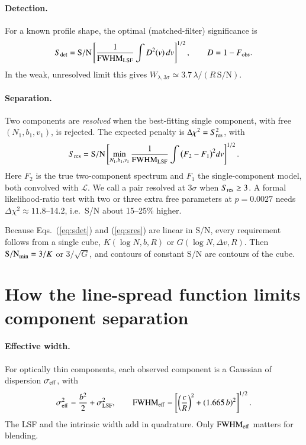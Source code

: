 \documentclass[10pt]{article}
\newcommand{\SN}{\ensuremath{\mathrm{S/N}}}
\newcommand{\fwhm}{\ensuremath{\mathrm{FWHM}}}
\newcommand{\Sdet}{\ensuremath{S_{\rm det}}}
\newcommand{\Sres}{\ensuremath{S_{\rm res}}}
\begin{document}
\paragraph{Detection.} For a known profile shape, the optimal (matched-filter) significance is
\begin{equation}
\Sdet=\SN\left[\frac{1}{\fwhm_{\rm LSF}}\int D^2(v)\,dv\right]^{1/2},\qquad D=1-F_{\rm obs}.
\label{eq:sdet}
\end{equation}
In the weak, unresolved limit this gives $W_{\lambda,3\sigma}\simeq3.7\,\lambda/(R\,\SN)$.

\paragraph{Separation.} Two components are \emph{resolved} when the best-fitting single component, with free $(N_1,b_1,v_1)$, is rejected. The expected penalty is $\Delta\chi^2=\Sres^2$, with
\begin{equation}
\Sres=\SN\left[\min_{N_1,b_1,v_1}\frac{1}{\fwhm_{\rm LSF}}\int\big(F_{2}-F_{1}\big)^2dv\right]^{1/2}.
\label{eq:sres}
\end{equation}
Here $F_2$ is the true two-component spectrum and $F_1$ the single-component model, both convolved with $\mathcal{L}$. We call a pair resolved at 3$\sigma$ when $\Sres\ge3$. A formal likelihood-ratio test with two or three extra free parameters at $p=0.0027$ needs $\Delta\chi^2\approx11.8$--14.2, i.e.\ S/N about 15--25\% higher.

Because Eqs.~(\ref{eq:sdet}) and (\ref{eq:sres}) are linear in S/N, every requirement follows from a single cube, $K(\log N,b,R)$ or $G(\log N,\Delta v,R)$. Then $\SN_{\rm min}=3/K$ or $3/\sqrt{G}$, and contours of constant S/N are contours of the cube.

\section{How the line-spread function limits component separation}
\paragraph{Effective width.} For optically thin components, each observed component is a Gaussian of dispersion $\sigma_{\rm eff}$, with
\begin{equation}
\sigma_{\rm eff}^2=\frac{b^2}{2}+\sigma_{\rm LSF}^2,\qquad
\fwhm_{\rm eff}=\left[\left(\frac{c}{R}\right)^2+(1.665\,b)^2\right]^{1/2}.
\end{equation}
The LSF and the intrinsic width add in quadrature. Only $\fwhm_{\rm eff}$ matters for blending.
\end{document}
